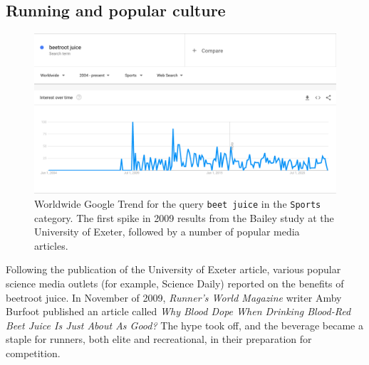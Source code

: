     \subsection{Running and popular culture}
    \begin{figure}
        \centering
        \includegraphics[width=1.0\textwidth]{assets/googletrends.png}
        \caption{Worldwide Google Trend for the query \texttt{beet juice} in the \texttt{Sports} category. The first spike in 2009 results from the Bailey study at the University of Exeter, followed by a number of popular media articles.}
        \label{fig:googletrends}
    \end{figure}
Following the publication of the University of Exeter article, various popular science media outlets (for example, Science Daily\cite{sciencedaily_2009}) reported on the benefits of beetroot juice.  In November of 2009, \textit{Runner's World Magazine} writer Amby Burfoot published an article called \textit{Why Blood Dope When Drinking Blood-Red Beet Juice Is Just About As Good?}\cite{burfoot_2020} The hype took off, and the beverage became a staple for runners, both elite and recreational, in their preparation for competition.
